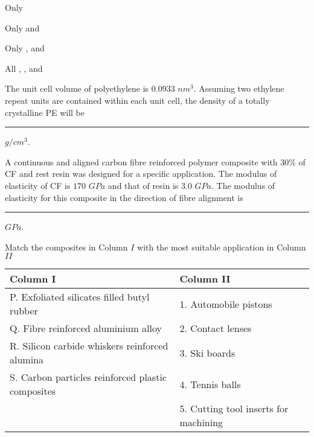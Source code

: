\hfill{}
\begin{enumerate}
\begin{multicols}{2}
    \item Only 
    \item Only  and 
    \item Only ,  and 
    \item All , ,  and 
\end{multicols}
\end{enumerate}

\item The unit cell volume of polyethylene  is $0.0933$ $nm^3$. Assuming two ethylene repeat units are contained within each unit cell, the density of a totally crystalline PE will be \rule{2.5cm}{0.4pt}$g/cm^3$. \\ 

\hfill{}

\item A continuous and aligned carbon fibre  reinforced polymer composite with $30\%$ of CF and rest resin was designed for a specific application. The modulus of elasticity of CF is $170$ $GPa$ and that of resin is $3.0$ $GPa$. The modulus of elasticity for this composite in the direction of fibre alignment is \rule{2.5cm}{0.4pt}$GPa$.

\hfill{}

\item Match the composites in Column $I$ with the most suitable application in Column $II$
\\\begin{table}[h!]    
  \centering
  \begin{tabular}{| p{6.5cm} | p{5cm} |}
\hline
\textbf{Column I} & \textbf{Column II} \\
\hline
P. Exfoliated silicates filled butyl rubber & 1. Automobile pistons \\
\hline
Q. Fibre reinforced aluminium alloy & 2. Contact lenses \\
\hline
R. Silicon carbide whiskers reinforced alumina & 3. Ski boards \\
\hline
S. Carbon particles reinforced plastic composites & 4. Tennis balls \\
\hline
& 5. Cutting tool inserts for machining \\
\hline
\end{tabular}
\end{table}\\

